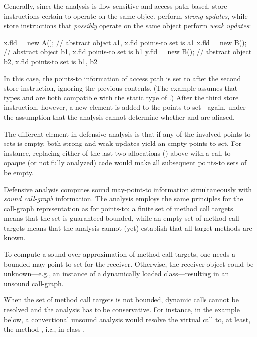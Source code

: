 Generally, since the analysis is flow-sensitive and access-path based, store instructions certain to operate on the same object perform \emph{strong updates}, while store instructions that \emph{possibly} operate on the same object perform \emph{weak updates}:

\begin{javaBox}
x.fld = new A();  // abstract object a1, x.fld points-to set is {a1}
x.fld = new B();  // abstract object b1, x.fld points-to set is {b1} 
y.fld = new B();  // abstract object b2, x.fld points-to set is {b1, b2}
\end{javaBox}

In this case, the points-to information of access path  is set to  after the second store instruction, ignoring the previous contents. (The example assumes that types  and  are both compatible with the static type of .) After the third store instruction, however, a new element is added to the points-to set---again, under the assumption that the analysis cannot determine whether  and  are aliased.

The different element in defensive analysis is that if any of the involved points-to sets is empty, both strong and weak updates yield an empty points-to set. For instance, replacing either of the last two allocations () above with a call to opaque (or not fully analyzed) code would make all subsequent points-to sets of  be empty.


Defensive analysis computes sound may-point-to information simultaneously with \emph{sound call-graph} information. The analysis employs the same principles for the call-graph representation as for points-to: a finite set of method call targets means that the set is guaranteed bounded, while an empty set of method call targets means that the analysis cannot (yet) establish that all target methods are known.

To compute a sound over-approximation of method call targets, one needs a bounded may-point-to set for the receiver. Otherwise, the receiver object could be unknown---e.g., an instance of a dynamically loaded class---resulting in an unsound call-graph.

When the set of method call targets is not bounded, dynamic calls cannot be resolved and the analysis has to be conservative. For instance, in the example below, a conventional unsound analysis would resolve the virtual call  to, at least, the method , i.e.,  in class .

